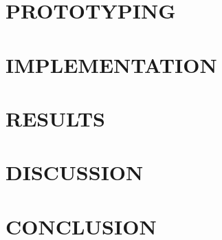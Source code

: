 \documentclass[12pt, twoside]{report}
\makeatletter
\newcommand\AppendixName{Appendix}
\let\oldappendix\appendix
\renewcommand{\appendix}{%
  \oldappendix
  \renewcommand{\chaptername}{\AppendixName}  \renewcommand{\thechapter}{\@Alph\c@chapter}}
\makeatother
\begin{document}
\chapter{PROTOTYPING}\label{ch:proto}


\chapter{IMPLEMENTATION}\label{ch:impl}


\chapter{RESULTS}\label{ch:result}


\chapter{DISCUSSION}\label{ch:discussion}


\chapter{CONCLUSION}\label{ch:conclusion}





\appendix

\end{document}
